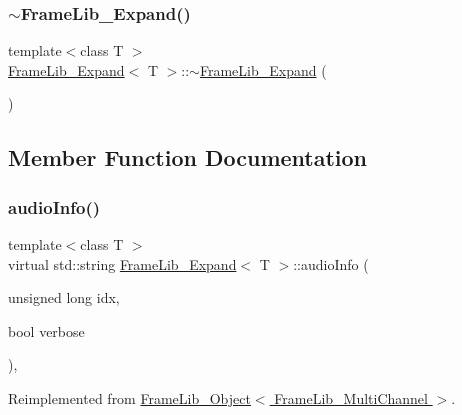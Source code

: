 \subsubsection{\texorpdfstring{$\sim$\+Frame\+Lib\+\_\+\+Expand()}{~FrameLib\_Expand()}}
{\footnotesize\ttfamily template$<$class T $>$ \\
\hyperlink{class_frame_lib___expand}{Frame\+Lib\+\_\+\+Expand}$<$ T $>$\+::$\sim$\hyperlink{class_frame_lib___expand}{Frame\+Lib\+\_\+\+Expand} (\begin{DoxyParamCaption}{ }\end{DoxyParamCaption})\hspace{0.3cm}{\ttfamily [inline]}}



\subsection{Member Function Documentation}
\mbox{\label{class_frame_lib___expand_a94ab97ff114452551719fad428fd2d6e}} 
\subsubsection{\texorpdfstring{audio\+Info()}{audioInfo()}}
{\footnotesize\ttfamily template$<$class T $>$ \\
virtual std\+::string \hyperlink{class_frame_lib___expand}{Frame\+Lib\+\_\+\+Expand}$<$ T $>$\+::audio\+Info (\begin{DoxyParamCaption}\item[{unsigned long}]{idx,  }\item[{bool}]{verbose }\end{DoxyParamCaption})\hspace{0.3cm}{\ttfamily [inline]}, {\ttfamily [virtual]}}



Reimplemented from \hyperlink{class_frame_lib___object_af618fcdec82b457911147c7c293bedd7}{Frame\+Lib\+\_\+\+Object$<$ Frame\+Lib\+\_\+\+Multi\+Channel $>$}.

\mbox{\label{class_frame_lib___expand_ae712d631cb99284e91c3f318534b3c03}} 
